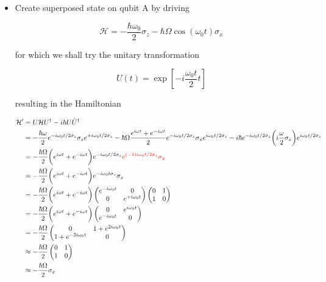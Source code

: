 
	\begin{itemize}
		\item Create superposed state on qubit A by driving
		
		\begin{equation}\label{app2}
		\mathcal{H} = -\frac{\hbar\omega_0}{2}\sigma_z-\hbar\Omega\cos(\omega_0 t)\sigma_x
		\end{equation}
		
		\noindent for which we shall try the unitary transformation
		
		\begin{equation}\label{app2Try}
		U(t) = \exp\left[-i\frac{\omega_0 t}{2}t\right]
		\end{equation}  
		
		\noindent resulting in the Hamiltonian 
		
		\begin{equation}\label{app2New}
		\begin{aligned}
		\mathcal{H'} & = U\mathcal{H}U^{\dagger} - i\hbar U\dot{U}^{\dagger}\\
		& = -\frac{\hbar\omega}{2}e^{-i\omega_0t/2\sigma_z}\sigma_ze^{+i\omega_0t/2\sigma_z}-\hbar\Omega\frac{e^{i\omega t}+e^{-i\omega t}}{2}e^{-i\omega_0t/2\sigma_z}\sigma_xe^{i\omega_0t/2\sigma_z}- i\hbar e^{-i\omega_0t/2\sigma_z}\bigg(i\frac{\omega}{2}\sigma_z\bigg)e^{i\omega_0t/2\sigma_z}\\
		& = -\frac{\hbar\Omega}{2}\bigg(e^{i\omega t}+e^{-i\omega t}\bigg)e^{-i\omega_0t/2\sigma_z}{\color{red}{e^{(-1)i\omega_0t/2\sigma_z}\sigma_x}}\\
		& = -\frac{\hbar\Omega}{2}\bigg(e^{i\omega t}+e^{-i\omega t}\bigg){e^{-i\omega_0t\sigma_z}\sigma_x}\\
		& =-\frac{\hbar\Omega}{2}\bigg(e^{i\omega t}+e^{-i\omega t}\bigg)\begin{pmatrix}
		e^{-i\omega_0t}&0\\0&e^{+i\omega_0t}
		\end{pmatrix}\begin{pmatrix}
		0&1\\1&0
		\end{pmatrix}\\
		& =-\frac{\hbar\Omega}{2}\bigg(e^{i\omega t}+e^{-i\omega t}\bigg)\begin{pmatrix}
		0&e^{i\omega_0t}\\e^{-i\omega_0t}&0
		\end{pmatrix}
		\\
		& =-\frac{\hbar\Omega}{2}\begin{pmatrix}
		0&1+e^{2i\omega_0t}\\1+e^{-2i\omega_0t}&0
		\end{pmatrix}
		\\
		& \approx -\frac{\hbar\Omega}{2}\begin{pmatrix}
		0&1\\1&0
		\end{pmatrix}
		\\
		& \approx -\frac{\hbar\Omega}{2}\sigma_x
		\end{aligned}
		\end{equation}
		

\end{itemize}
